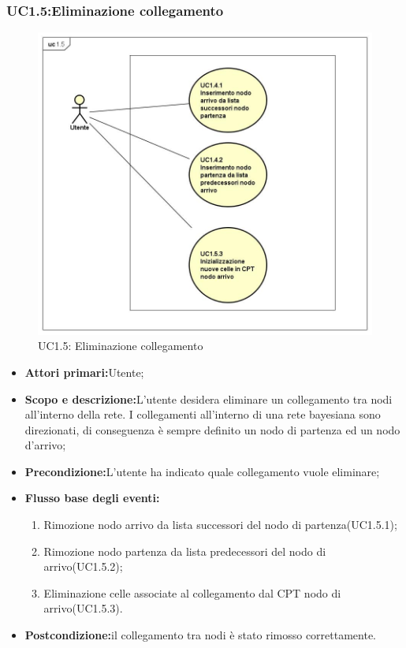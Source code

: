 \subsubsection{UC1.5:Eliminazione collegamento}
\begin{figure} [H]
	\centering
	\includegraphics[scale=0.45]{Img/UC1-5}
	\caption{UC1.5: Eliminazione collegamento}\label{}
\end{figure}
\begin{itemize}
	\item{\textbf{Attori primari:}Utente;}
	\item{\textbf{Scopo e descrizione:}L'utente desidera eliminare un collegamento tra nodi all'interno della rete. I collegamenti all'interno di una rete bayesiana sono direzionati, di conseguenza è sempre definito un nodo di partenza ed un nodo d'arrivo;}
	\item{\textbf{Precondizione:}L'utente ha indicato quale collegamento vuole eliminare;}
	\item{\textbf{Flusso base degli eventi:}}
		\begin{enumerate}
			\item{Rimozione nodo arrivo da lista successori del nodo di partenza(UC1.5.1);}
			\item{Rimozione nodo partenza da lista predecessori del nodo di arrivo(UC1.5.2);}
			\item{Eliminazione celle associate al collegamento dal CPT nodo di arrivo(UC1.5.3).}
		\end{enumerate}
	\item{\textbf{Postcondizione:}il collegamento tra nodi è stato rimosso correttamente.}
\end{itemize}
